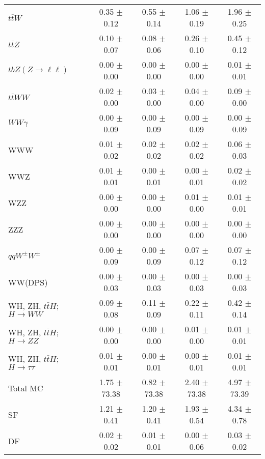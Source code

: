 \begin{tabular}{l|cccc}
                   $t\overline{t}W$ &  0.35 $\pm$  0.12 &  0.55 $\pm$  0.14 &  1.06 $\pm$  0.19 &  1.96 $\pm$  0.25 \\
                   $t\overline{t}Z$ &  0.10 $\pm$  0.07 &  0.08 $\pm$  0.06 &  0.26 $\pm$  0.10 &  0.45 $\pm$  0.12 \\
    $tbZ (Z \rightarrow \ell \ell)$ &  0.00 $\pm$  0.00 &  0.00 $\pm$  0.00 &  0.00 $\pm$  0.00 &  0.01 $\pm$  0.01 \\
                  $t\overline{t}WW$ &  0.02 $\pm$  0.00 &  0.03 $\pm$  0.00 &  0.04 $\pm$  0.00 &  0.09 $\pm$  0.00 \\
                         $WW\gamma$ &  0.00 $\pm$  0.09 &  0.00 $\pm$  0.09 &  0.00 $\pm$  0.09 &  0.00 $\pm$  0.09 \\
                                WWW &  0.01 $\pm$  0.02 &  0.02 $\pm$  0.02 &  0.02 $\pm$  0.02 &  0.06 $\pm$  0.03 \\
                                WWZ &  0.01 $\pm$  0.01 &  0.00 $\pm$  0.01 &  0.00 $\pm$  0.01 &  0.02 $\pm$  0.02 \\
                                WZZ &  0.00 $\pm$  0.00 &  0.00 $\pm$  0.00 &  0.01 $\pm$  0.00 &  0.01 $\pm$  0.01 \\
                                ZZZ &  0.00 $\pm$  0.00 &  0.00 $\pm$  0.00 &  0.00 $\pm$  0.00 &  0.00 $\pm$  0.00 \\
                 $qqW^{\pm}W^{\pm}$ &  0.00 $\pm$  0.09 &  0.00 $\pm$  0.09 &  0.07 $\pm$  0.12 &  0.07 $\pm$  0.12 \\
                            WW(DPS) &  0.00 $\pm$  0.03 &  0.00 $\pm$  0.03 &  0.00 $\pm$  0.03 &  0.00 $\pm$  0.03 \\
WH, ZH, $t\bar{t}H$; $H \rightarrow WW$ &  0.09 $\pm$  0.08 &  0.11 $\pm$  0.09 &  0.22 $\pm$  0.11 &  0.42 $\pm$  0.14 \\
WH, ZH, $t\bar{t}H$; $H \rightarrow ZZ$ &  0.00 $\pm$  0.00 &  0.00 $\pm$  0.00 &  0.01 $\pm$  0.00 &  0.01 $\pm$  0.01 \\
WH, ZH, $t\bar{t}H$; $H \rightarrow \tau\tau$ &  0.01 $\pm$  0.01 &  0.00 $\pm$  0.01 &  0.00 $\pm$  0.01 &  0.01 $\pm$  0.01 \\
\hline\hline
                           Total MC &  1.75 $\pm$ 73.38 &  0.82 $\pm$ 73.38 &  2.40 $\pm$ 73.38 &  4.97 $\pm$ 73.39 \\
\hline
                                 SF &  1.21 $\pm$  0.41 &  1.20 $\pm$  0.41 &  1.93 $\pm$  0.54 &  4.34 $\pm$  0.78 \\
                                 DF &  0.02 $\pm$  0.02 &  0.01 $\pm$  0.01 &  0.00 $\pm$  0.06 &  0.03 $\pm$  0.02 \\

\end{tabular}
